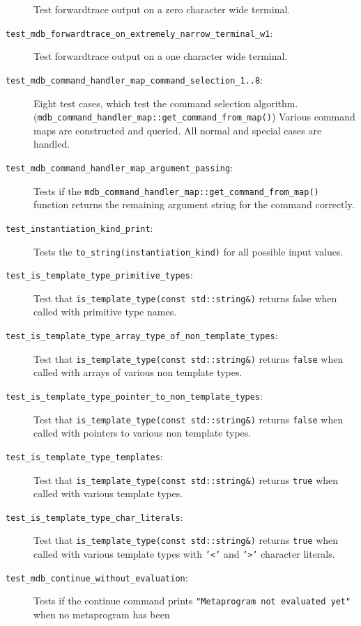\begin{description}
        Test forwardtrace output on a zero character wide terminal.
    \item[\texttt{test\_mdb\_forwardtrace\_on\_extremely\_narrow\_terminal\_w1}:]
        Test forwardtrace output on a one character wide terminal.
    \item[\texttt{test\_mdb\_command\_handler\_map\_command\_selection\_1..8}:]
        Eight test cases, which test the command selection algorithm.
        (\texttt{mdb\_command\_handler\_map::get\_command\_from\_map()})
        Various command maps are constructed and queried. All normal and
        special cases are handled.
    \item[\texttt{test\_mdb\_command\_handler\_map\_argument\_passing}:]
        Tests if the
        \texttt{mdb\_command\_handler\_map::get\_command\_from\_map()}
        function returns the remaining argument string for the command
        correctly.
    \item[\texttt{test\_instantiation\_kind\_print}:]
        Tests the \texttt{to\_string(instantiation\_kind)} for all possible
        input values.
    \item[\texttt{test\_is\_template\_type\_primitive\_types}:]
        Test that \texttt{is\_template\_type(const std::string\&)} returns
        false when called with primitive type names.
    \item[\texttt{test\_is\_template\_type\_array\_type\_of\_non\_template\_types}:]
        Test that \texttt{is\_template\_type(const std::string\&)} returns
        \texttt{false} when called with arrays of various non template types.
    \item[\texttt{test\_is\_template\_type\_pointer\_to\_non\_template\_types}:]
        Test that \texttt{is\_template\_type(const std::string\&)} returns
        \texttt{false} when called with pointers to various non template types.
    \item[\texttt{test\_is\_template\_type\_templates}:]
        Test that \texttt{is\_template\_type(const std::string\&)} returns
        \texttt{true} when called with various template types.
    \item[\texttt{test\_is\_template\_type\_char\_literals}:]
        Test that \texttt{is\_template\_type(const std::string\&)} returns
        \texttt{true} when called with various template types with
        \texttt{'<'} and \texttt{'>'} character literals.
    \item[\texttt{test\_mdb\_continue\_without\_evaluation}:]
        Tests if the continue command prints
        \texttt{"Metaprogram not evaluated yet"} when no metaprogram has been

\end{description}
